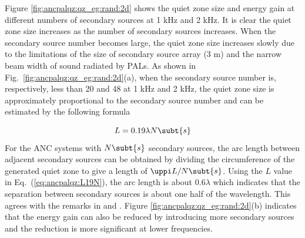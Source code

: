 Figure \ref{fig:ancpalqz:qz_eg:rand:2d} shows the quiet zone size and energy gain at different numbers of secondary sources at 1 kHz and 2 kHz. 
It is clear the quiet zone size increases as the number of secondary sources increases. 
When the secondary source number becomes large, the quiet zone size increases slowly due to the limitations of the size of secondary source array (3 m) and the narrow beam width of sound radiated by PALs. 
As shown in Fig.~\ref{fig:ancpalqz:qz_eg:rand:2d}(a), when the secondary source number is, respectively, less than 20 and 48 at 1 kHz and 2 kHz, the quiet zone size is approximately proportional to the secondary source number and can be estimated by the following formula 

\begin{equation}
    L = 0.19\lambda N\subt{s}
    \label{eq:ancpalqz:L19N}
\end{equation}
For the ANC systems with $N\subt{s}$ secondary sources, the arc length between adjacent secondary sources can be obtained by dividing the circumference of the generated quiet zone to give a length of $\uppi L / N\subt{s} $. 
Using the $L$ value in Eq.~(\ref{eq:ancpalqz:L19N}), the arc length is about $0.6\lambda$ which indicates that the separation between secondary sources is about one half of the wavelength. 
This agrees with the remarks in \cite{Qiu2019IntroductionVirtualSound} and \cite{Nelson1992ActiveControlSound}.
Figure \ref{fig:ancpalqz:qz_eg:rand:2d}(b) indicates that the energy gain can also be reduced by introducing more secondary sources and the reduction is more significant at lower frequencies.

